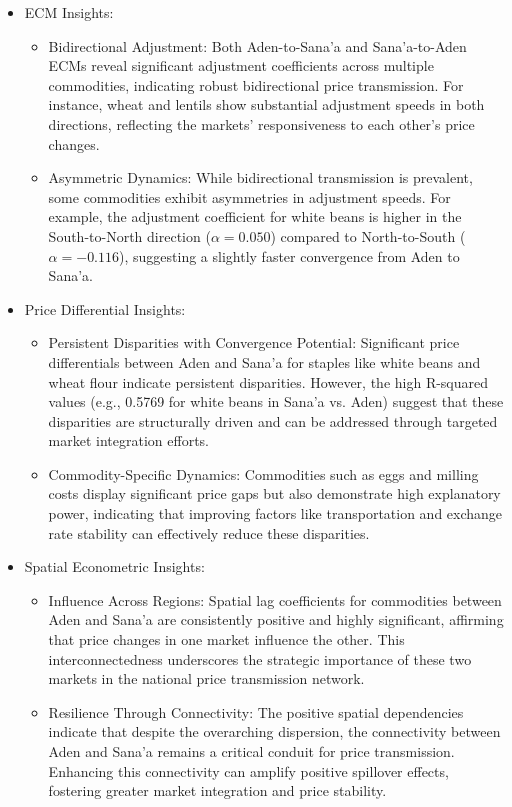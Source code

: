 \begin{itemize}
\item ECM Insights:
  \begin{itemize}
  \item Bidirectional Adjustment: Both Aden-to-Sana'a and Sana'a-to-Aden ECMs reveal significant adjustment coefficients across multiple commodities, indicating robust bidirectional price transmission. For instance, wheat and lentils show substantial adjustment speeds in both directions, reflecting the markets' responsiveness to each other's price changes.
  
  \item Asymmetric Dynamics: While bidirectional transmission is prevalent, some commodities exhibit asymmetries in adjustment speeds. For example, the adjustment coefficient for white beans is higher in the South-to-North direction ($\alpha = 0.050$) compared to North-to-South ($\alpha = -0.116$), suggesting a slightly faster convergence from Aden to Sana'a.
  \end{itemize}

\item Price Differential Insights:
  \begin{itemize}
  \item Persistent Disparities with Convergence Potential: Significant price differentials between Aden and Sana'a for staples like white beans and wheat flour indicate persistent disparities. However, the high R-squared values (e.g., 0.5769 for white beans in Sana'a vs. Aden) suggest that these disparities are structurally driven and can be addressed through targeted market integration efforts.
  
  \item Commodity-Specific Dynamics: Commodities such as eggs and milling costs display significant price gaps but also demonstrate high explanatory power, indicating that improving factors like transportation and exchange rate stability can effectively reduce these disparities.
  \end{itemize}

\item Spatial Econometric Insights:
  \begin{itemize}
  \item Influence Across Regions: Spatial lag coefficients for commodities between Aden and Sana'a are consistently positive and highly significant, affirming that price changes in one market influence the other. This interconnectedness underscores the strategic importance of these two markets in the national price transmission network.
  
  \item Resilience Through Connectivity: The positive spatial dependencies indicate that despite the overarching dispersion, the connectivity between Aden and Sana'a remains a critical conduit for price transmission. Enhancing this connectivity can amplify positive spillover effects, fostering greater market integration and price stability.
  \end{itemize}
\end{itemize}

